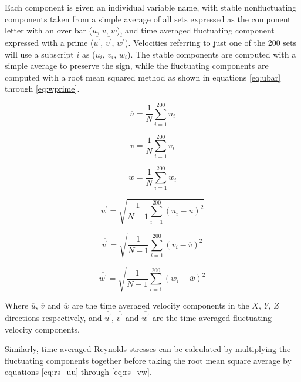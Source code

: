 Each component is given an individual variable name, with stable nonfluctuating 
components taken from a simple average of all sets expressed as the component 
letter with an over bar ($\overline{u}$, $\overline{v}$, $\overline{w}$), and 
time averaged fluctuating component expressed with a prime 
($\overline{u^\prime}$, $\overline{v^\prime}$, $\overline{w^\prime}$). 
Velocities referring to just one of the 200 sets will use a 
subscript $i$ as ($u_i$, $v_i$, $w_i$). The stable components are computed with 
a simple average to preserve the sign, while the fluctuating components are 
computed with a root mean squared method as shown in equations \ref{eq:ubar} 
through \ref{eq:wprime}.

\begin{equation}
\overline{u}  = \frac{1}{N} \sum_{i=1}^{200} u_i
\label{eq:ubar}
\end{equation}

\begin{equation}
\overline{v}  = \frac{1}{N} \sum_{i=1}^{200} v_i
\end{equation}

\begin{equation}
\overline{w}  = \frac{1}{N} \sum_{i=1}^{200} w_i
\end{equation}

\begin{equation}
\overline{u^\prime} = \sqrt{\frac{1}{N-1} \sum_{i=1}^{200} (u_i - 
\overline{u})^2}
\end{equation}

\begin{equation}
\overline{v^\prime} = \sqrt{\frac{1}{N-1} \sum_{i=1}^{200} (v_i - 
\overline{v})^2}
\end{equation}

\begin{equation}
\overline{w^\prime} = \sqrt{\frac{1}{N-1} \sum_{i=1}^{200} (w_i - 
\overline{w})^2}
\label{eq:wprime}
\end{equation}

Where $\overline{u}$, $\overline{v}$ and $\overline{w}$ are the time averaged 
velocity 
components in the $X$, $Y$, $Z$ directions respectively, and  
$\overline{u^\prime}$, $\overline{v^\prime}$ and $\overline{w^\prime}$ are the 
time averaged fluctuating velocity components.

Similarly, time averaged Reynolds stresses can be calculated by multiplying the 
fluctuating components together before taking the root mean square average by 
equations \ref{eq:rs_uu} through \ref{eq:rs_vw}.

